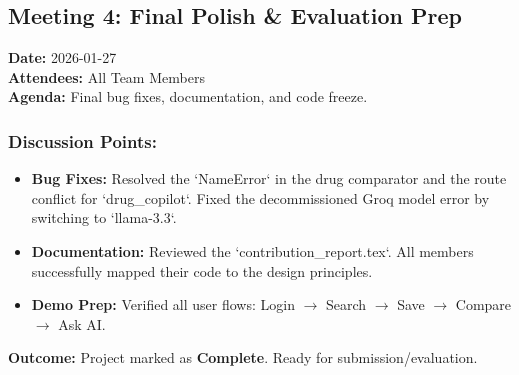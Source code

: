 \documentclass[a4paper,12pt]{article}
\begin{document}
\hrulefill

\subsection*{Meeting 4: Final Polish & Evaluation Prep}
\textbf{Date:} 2026-01-27 \\
\textbf{Attendees:} All Team Members \\
\textbf{Agenda:} Final bug fixes, documentation, and code freeze.

\subsubsection*{Discussion Points:}
\begin{itemize}
    \item \textbf{Bug Fixes:} Resolved the `NameError` in the drug comparator and the route conflict for `drug_copilot`. Fixed the decommissioned Groq model error by switching to `llama-3.3`.
    \item \textbf{Documentation:} Reviewed the `contribution_report.tex`. All members successfully mapped their code to the design principles.
    \item \textbf{Demo Prep:} Verified all user flows: Login $\rightarrow$ Search $\rightarrow$ Save $\rightarrow$ Compare $\rightarrow$ Ask AI.
\end{itemize}
\textbf{Outcome:} Project marked as \textbf{Complete}. Ready for submission/evaluation.
\end{document}
